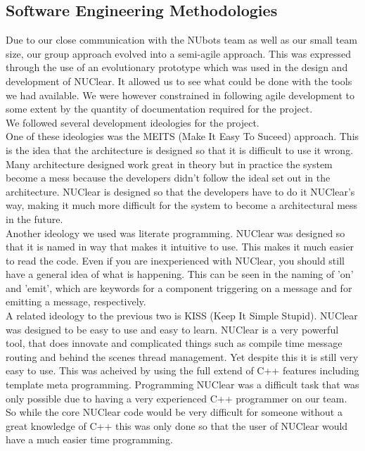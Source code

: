 \documentclass[english,12pt]{scrartcl}
\begin{document}
	\subsection{Software Engineering Methodologies}
		Due to our close communication with the NUbots team as well as our small team size, our group approach evolved into a semi-agile approach. 
		This was expressed through the use of an evolutionary prototype which was used in the design and development of NUClear. 
		It allowed us to see what could be done with the tools we had available. 
		We were however constrained in following agile development to some extent by the quantity of documentation required for the project.
		\\
		We followed several development ideologies for the project.
		\\
		One of these ideologies was the MEITS (Make It Easy To Suceed) approach.
		This is the idea that the architecture is designed so that it is difficult to use it wrong.
		Many architecture designed work great in theory but in practice the system become a mess because the developers didn't follow the ideal set out in the architecture.
		NUClear is designed so that the developers have to do it NUClear's way, making it much more difficult for the system to become a architectural mess in the future.
		\\
		Another ideology we used was literate programming.
		NUClear was designed so that it is named in way that makes it intuitive to use.
		This makes it much easier to read the code.
		Even if you are inexperienced with NUClear, you should still have a general idea of what is happening.
		This can be seen in the naming of 'on' and 'emit', which are keywords for a component triggering on a message and for emitting a message, respectively.
		\\
		A related ideology to the previous two is KISS (Keep It Simple Stupid).
		NUClear was designed to be easy to use and easy to learn.
		NUClear is a very powerful tool, that does innovate and complicated things such as compile time message routing and behind the scenes thread management.
		Yet despite this it is still very easy to use.
		This was acheived by using the full extend of C++ features including template meta programming.
		Programming NUClear was a difficult task that was only possible due to having a very experienced C++ programmer on our team.
		So while the core NUClear code would be very difficult for someone without a great knowledge of C++ this was only done so that the user of NUClear would have a much easier time programming.
\end{document}
